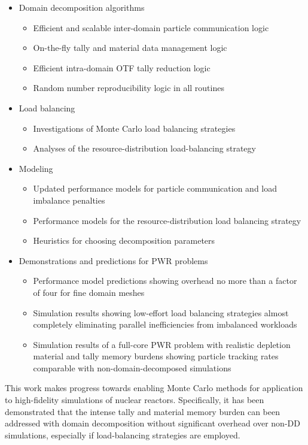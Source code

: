 \documentclass[12pt,twoside]{mitthesis-exec}
\begin{document}
\begin{itemize}
  \item Domain decomposition algorithms
  \begin{itemize}
    \item Efficient and scalable inter-domain particle communication logic
    \item On-the-fly tally and material data management logic
    \item Efficient intra-domain OTF tally reduction logic
    \item Random number reproducibility logic in all routines
  \end{itemize}
  \item Load balancing
  \begin{itemize}
    \item Investigations of Monte Carlo load balancing strategies
    \item Analyses of the resource-distribution load-balancing strategy
  \end{itemize}
  \item Modeling
  \begin{itemize}
    \item Updated performance models for particle communication and load
    imbalance penalties
    \item Performance models for the resource-distribution load balancing strategy
    \item Heuristics for choosing decomposition parameters
  \end{itemize}
  \item Demonstrations and predictions for PWR problems
  \begin{itemize}
    \item Performance model predictions showing overhead no more than a factor
    of four for fine domain meshes
    \item Simulation results showing low-effort load balancing strategies
    almost completely eliminating parallel inefficiencies from imbalanced
    workloads
    \item Simulation results of a full-core PWR problem with realistic
    depletion material and tally memory burdens showing particle tracking rates
    comparable with non-domain-decomposed simulations
  \end{itemize}
\end{itemize}

This work makes progress towards enabling Monte Carlo methods for application
to high-fidelity simulations of nuclear reactors. Specifically, it has been
demonstrated that the intense tally and material memory burden can been
addressed with domain decomposition without significant overhead over non-DD
simulations, especially if load-balancing strategies are employed.
\end{document}
